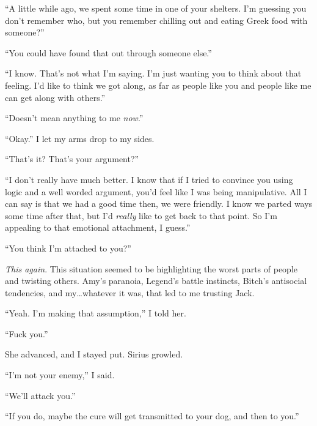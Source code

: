 ``A little while ago, we spent some time in one of your shelters.  I'm guessing you don't remember who, but you remember chilling out and eating Greek food with someone?''



``You could have found that out through someone else.''



``I know.  That's not what I'm saying.  I'm just wanting you to think about that feeling.  I'd like to think we got along, as far as people like you and people like me can get along with others.''



``Doesn't mean anything to me \emph{now}.''



``Okay.''  I let my arms drop to my sides.



``That's it?  That's your argument?''



``I don't really have much better.  I know that if I tried to convince you using logic and a well worded argument, you'd feel like I was being manipulative.  All I can say is that we had a good time then, we were friendly.  I know we parted ways some time after that, but I'd \emph{really} like to get back to that point.  So I'm appealing to that emotional attachment, I guess.''



``You think I'm attached to you?''



\emph{This again}.  This situation seemed to be highlighting the worst parts of people and twisting others.  Amy's paranoia, Legend's battle instincts, Bitch's antisocial tendencies, and my\ldots whatever it was, that led to me trusting Jack.



``Yeah.  I'm making that assumption,'' I told her.



``Fuck you.''



She advanced, and I stayed put.  Sirius growled.



``I'm not your enemy,'' I said.



``We'll attack you.''



``If you do, maybe the cure will get transmitted to your dog, and then to you.''



